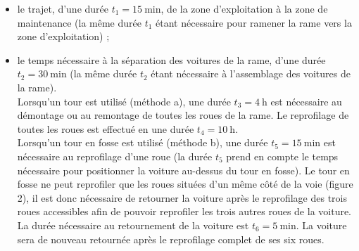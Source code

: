 \documentclass[10pt]{article}
\begin{document}
\begin{itemize}
  \item le trajet, d'une durée $t_{1}=15 \mathrm{~min}$, de la zone d'exploitation à la zone de maintenance (la même durée $t_{1}$ étant nécessaire pour ramener la rame vers la zone d'exploitation) ;
  \item le temps nécessaire à la séparation des voitures de la rame, d'une durée $t_{2}=30 \mathrm{~min}$ (la même durée $t_{2}$ étant nécessaire à l'assemblage des voitures de la rame).\\
Lorsqu'un tour est utilisé (méthode a), une durée $t_{3}=4 \mathrm{~h}$ est nécessaire au démontage ou au remontage de toutes les roues de la rame. Le reprofilage de toutes les roues est effectué en une durée $t_{4}=10 \mathrm{~h}$.\\
Lorsqu'un tour en fosse est utilisé (méthode b), une durée $t_{5}=15 \mathrm{~min}$ est nécessaire au reprofilage d'une roue (la durée $t_{5}$ prend en compte le temps nécessaire pour positionner la voiture au-dessus du tour en fosse). Le tour en fosse ne peut reprofiler que les roues situées d'un même côté de la voie (figure 2), il est donc nécessaire de retourner la voiture après le reprofilage des trois roues accessibles afin de pouvoir reprofiler les trois autres roues de la voiture. La durée nécessaire au retournement de la voiture est $t_{6}=5 \mathrm{~min}$. La voiture sera de nouveau retournée après le reprofilage complet de ses six roues.
\end{itemize}
\end{document}
